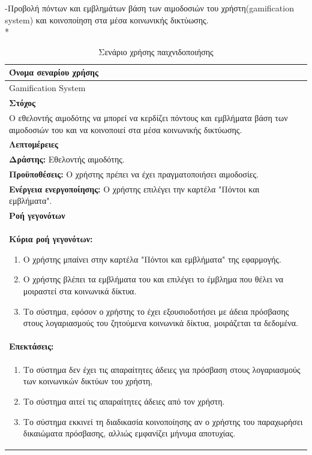 \newpage
-Προβολή πόντων και εμβλημάτων βάση των αιμοδοσιών του χρήστη(gamification system) και κοινοποίηση στα μέσα κοινωνικής δικτύωσης.
\\*
\begin{table}[H]
	\begin{center}
	    \begin{tabular}{|p{\dimexpr \linewidth-2\tabcolsep}|}
	    \hline
	    \rowcolor{grayy}
	    \textbf{Όνομα σεναρίου χρήσης}
	    \\ \hline    
	     Gamification System
	     \\ \hline
	    \rowcolor{grayy}
	    \textbf{\textbf{Στόχος}}
	    \\ \hline
	 	 Ο εθελοντής αιμοδότης να μπορεί να κερδίζει πόντους και εμβλήματα βάση των αιμοδοσιών του και να κοινοποιεί στα μέσα κοινωνικής δικτύωσης.
	    \\ \hline
	    \rowcolor{grayy}
	    \textbf{Λεπτομέρειες}
	    \\ \hline
		\textbf{Δράστης:} Εθελοντής αιμοδότης.
		\\*
		\textbf{Προϋποθέσεις:} Ο χρήστης πρέπει να έχει πραγματοποιήσει αιμοδοσίες.
		\\*
		\textbf{Ενέργεια ενεργοποίησης:} Ο χρήστης επιλέγει την καρτέλα "Πόντοι και εμβλήματα".
		\\ \hline
		\rowcolor{grayy}    
	    \textbf{Ροή γεγονότων}
	    \\ \hline
		\textbf{Κύρια ροή γεγονότων:}
		\begin{enumerate}
		\item	 Ο χρήστης μπαίνει  στην καρτέλα "Πόντοι και εμβλήματα" της εφαρμογής.
		\item Ο χρήστης βλέπει τα εμβλήματα του και επιλέγει το έμβλημα που θέλει να μοιραστεί στα κοινωνικά δίκτυα.
		\item Το σύστημα, εφόσον ο χρήστης το έχει εξουσιοδοτήσει με άδεια πρόσβασης στους λογαριασμούς του ζητούμενα κοινωνικά δίκτυα, μοιράζεται τα δεδομένα.
		\end{enumerate}
		\\ \hline
		\rowcolor{grayy}
		\textbf{Επεκτάσεις:}
		   \\ \hline
		\begin{enumerate}
			\item Το σύστημα δεν έχει τις απαραίτητες άδειες για πρόσβαση στους λογαριασμούς των κοινωνικών δικτύων του χρήστη,
			\item Το σύστημα αιτεί τις απαραίτητες άδειες από τον χρήστη.
			\item Το σύστημα εκκινεί τη διαδικασία κοινοποίησης αν ο χρήστης του παραχωρήσει δικαιώματα πρόσβασης, αλλιώς εμφανίζει μήνυμα αποτυχίας.
		\end{enumerate}
		\\ \hline
	    \end{tabular}
	    \caption{Σενάριο χρήσης παιχνιδοποιήσης}
	    \label{tab:use_case_gamification} 
	\end{center}
\end{table}

